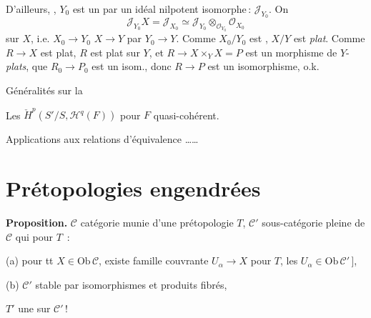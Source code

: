 \documentclass[11pt,a4paper]{article}
\begin{document}
D'ailleurs,   \ill{}
\ill{} \ill{} , $Y_0$ est un 
 par un idéal nilpotent isomorphe\,:
$\mathcal{J}_{Y_0}$. On   
\[
  \mathcal{J}_{Y_0} X = \mathcal{J}_{X_0} \simeq
  \mathcal{J}_{Y_0} \otimes_{\mathcal{O}_{Y_0}} \mathcal{O}_{X_0}
\]
  sur $X$, i.e. $X_0 \to Y_0$
 $X \to Y$ par  $Y_0 \to Y$. Comme
 $X_0/Y_0$ est , $X/Y$ est \emph{plat}.
Comme $R \to X$ est plat, $R$ est plat sur $Y$, et $R \to X \times_Y X = P$
est un morphisme de $Y$- \emph{plats}, 
que $R_0 \to P_0$ est un isom., donc $R \to P$ est un isomorphisme, o.k.


Généralités sur la 

Les $\check{H}^p(S'/S, \mathcal{H}^q(F))$ pour $F$
quasi-cohérent.

Applications aux relations d'équivalence ……

\section*{Prétopologies engendrées}


\textbf{Proposition.} $\mathcal{C}$ catégorie munie d'une prétopologie
$T$,  $\mathcal{C}'$ sous-catégorie
\struck{\ill{}} pleine de $\mathcal{C}$ \struck{\ill{} \ill{}}
 \ill{} qui \emph{\ill{}} pour $T$
\struck{\ill{} \ill{}} \,:

(a) pour tt $X \in \mathrm{Ob}\,\mathcal{C}$, existe famille couvrante
$U_\alpha \to X$ pour $T$,  les $U_\alpha \in \mathrm{Ob}\,\mathcal{C}'$\,],
\struck{\ill{}}

(b) $\mathcal{C}'$ stable par isomorphismes et produits fibrés, \struck{\ill{}}

$T'$ une   sur $\mathcal{C}'$\,!
\struck{\ill{} \ill{} \ill{} \ill{} \ill{}}
\end{document}
